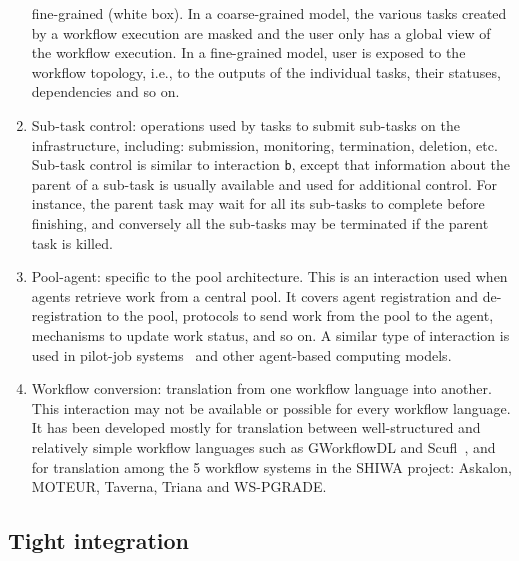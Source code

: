 \documentclass[preprint,3p,twocolumn]{elsarticle}
\begin{document}
\begin{enumerate}[leftmargin=0cm,itemindent=0.65cm,label=\texttt{(\alph*)}]
  fine-grained (white box). In a coarse-grained model, the various
  tasks created by a workflow execution are masked and the user only
  has a global view of the workflow execution. In a fine-grained
  model, user is exposed to the workflow topology, i.e., to the outputs
  of the individual tasks, their statuses, dependencies and so on.
\item Sub-task control: operations used by tasks to submit sub-tasks
  on the infrastructure, including: submission, monitoring,
  termination, deletion, etc. Sub-task control is similar to
  interaction \texttt{b}, except that information about the parent
  of a sub-task is usually available and used for
  additional control. For instance, the parent task may wait for all
  its sub-tasks to complete before finishing, and conversely all the
  sub-tasks may be terminated if the parent task is killed.
\item Pool-agent: specific to the pool architecture. This is an
  interaction used when agents retrieve work from a central pool. It
  covers agent registration and de-registration to the pool, protocols
  to send work from the pool to the agent, mechanisms to update work
  status, and so on. A similar type of interaction is used in
  pilot-job systems~\cite{turilli2015comprehensive} and other
  agent-based computing models.
\item Workflow conversion: translation from one workflow language into
  another. This interaction may not be available or possible for every
  workflow language. It has been developed mostly for translation
  between well-structured and relatively simple workflow languages
  such as GWorkflowDL and Scufl~\cite{OLAB-09}, and for translation
  among the 5 workflow systems in the SHIWA project: Askalon, MOTEUR,
  Taverna, Triana and WS-PGRADE.  
\end{enumerate}


\subsection{Tight integration}
\end{document}
